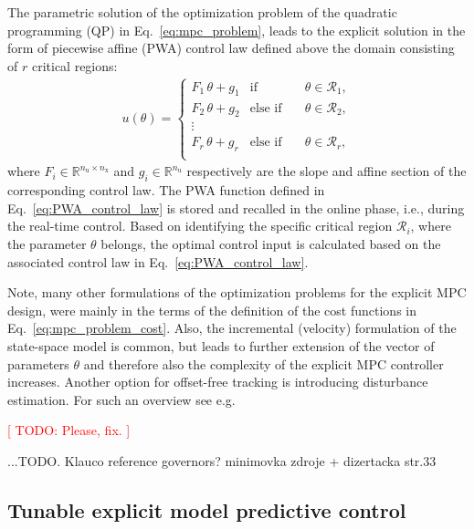 \documentclass[preprint,12pt]{elsarticle}
\begin{document}
	The parametric solution of the optimization problem of the quadratic programming (QP) in Eq.~\eqref{eq:mpc_problem}, leads to the explicit solution in the form of piecewise affine (PWA) control law defined above the domain consisting of $r$ critical regions:
	\begin{eqnarray}
		\label{eq:PWA_control_law}
		u(\theta) = \left\{ 
		\begin{matrix}
			F_{1} \, \theta + g_{1} & \mathrm{if} & \quad \theta \in \mathcal{R}_1, \\
			F_{2} \, \theta + g_{2} & \mathrm{else}\,\,\mathrm{if} &\quad \theta \in \mathcal{R}_2, \\
			\vdots & \\
			F_{r} \, \theta + g_{r} & \mathrm{else}\,\,\mathrm{if} & \quad \theta \in \mathcal{R}_{r}, \\
		\end{matrix}
		\right.
	\end{eqnarray}
	where $F_{i} \in \mathbb{R}^{n_{\mathrm{u}} \times n_{\mathrm{x}}}$ and $g_{i}  \in \mathbb{R}^{n_{\mathrm{u}}}$ respectively are the slope and affine section of the corresponding control law. The PWA function defined in Eq.~\eqref{eq:PWA_control_law} is stored and recalled in the online phase, i.e., during the real-time control. Based on identifying the specific critical region $\mathcal{R}_{i}$, where the parameter $\theta$ belongs, the optimal control input is calculated based on the associated control law in Eq.~\eqref{eq:PWA_control_law}.
	
	Note, many other formulations of the optimization problems for the explicit MPC design, were mainly in the terms of the definition of the cost functions in Eq.~\eqref{eq:mpc_problem_cost}. Also, the incremental (velocity) formulation of the state-space model is common, but leads to further extension of the vector of parameters $\theta$ and therefore also the complexity of the explicit MPC controller increases. Another option for offset-free tracking is introducing disturbance estimation. For such an overview see e.g. 
	
	\textcolor{red}{[ TODO: Please, fix. ]}
	
	...TODO. 
	Klauco reference governors? minimovka zdroje + dizertacka str.33
	
	\subsection{Tunable explicit model predictive control}
	\label{sec:tunable}
	
\end{document}
